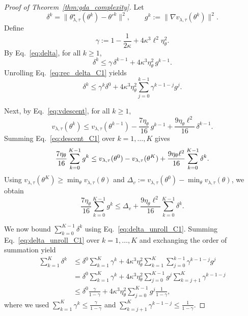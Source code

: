 \documentclass[sigconf]{acmart}
\begin{document}
\begin{proof}[Proof of Theorem~\ref{thm:gda_complexity}]
Let
\[
\delta^k
=
\bigl\|
\theta^{\star}_{\lambda,\tau}(\theta^k)
-
\theta'^k
\bigr\|^2,
\qquad
g^{k}
:=
\bigl\|
\nabla v_{\lambda,\tau}(\theta^{k})
\bigr\|^2.
\]
Define
\[
\gamma
:=
1-\frac{1}{2\kappa}+4\kappa^3\ell^2\eta_\theta^2.
\]
By Eq.~\eqref{eq:delta}, for all $k\ge 1$,
\begin{equation}
\label{eq:rec_delta_C1}
\delta^k \le \gamma\,\delta^{k-1}+4\kappa^3\eta_\theta^2\, g^{k-1}.
\end{equation}
Unrolling Eq.~\eqref{eq:rec_delta_C1} yields
\begin{equation}
\label{eq:delta_unroll_C1}
\delta^k
\le
\gamma^k \delta^0
+
4\kappa^3\eta_\theta^2
\sum_{j=0}^{k-1}\gamma^{k-1-j} g^{j}.
\end{equation}

Next, by Eq.~\eqref{eq:vdescent}, for all $k\ge 1$,
\begin{equation}
\label{eq:descent_C1}
v_{\lambda,\tau}(\theta^k)
\le
v_{\lambda,\tau}(\theta^{k-1})
-
\frac{7\eta_\theta}{16}\, g^{k-1}
+
\frac{9\eta_\theta\ell^2}{16}\,\delta^{k-1}.
\end{equation}
Summing Eq.~\eqref{eq:descent_C1} over $k=1,\dots,K$ gives
\begin{align}
\frac{7\eta_\theta}{16}\sum_{k=0}^{K-1} g^{k}
\le
v_{\lambda,\tau}(\theta^{0})-v_{\lambda,\tau}(\theta^{K})
+
\frac{9\eta_\theta\ell^2}{16}\sum_{k=0}^{K-1}\delta^{k}\notag.
\end{align}
Using $v_{\lambda,\tau}(\theta^{K})\ge \min_{\theta}v_{\lambda,\tau}(\theta)$ and
$\Delta_v:=v_{\lambda,\tau}(\theta^{0})-\min_{\theta}v_{\lambda,\tau}(\theta)$,
we obtain
\begin{equation}
\label{eq:sum_descent_C1b}
\frac{7\eta_\theta}{16}\sum_{k=0}^{K-1} g^{k}
\le
\Delta_v
+
\frac{9\eta_\theta\ell^2}{16}\sum_{k=0}^{K-1}\delta^{k}.
\end{equation}

We now bound $\sum_{k=0}^{K-1}\delta^{k}$ using Eq.~\eqref{eq:delta_unroll_C1}. Summing Eq.~\eqref{eq:delta_unroll_C1} over $k=1,\dots,K$ and exchanging the order of summation yield
\begin{align}
\sum_{k=1}^{K}\delta^{k}
&\le
\delta^{0}\sum_{k=1}^{K}\gamma^{k}
+
4\kappa^3\eta_\theta^2
\sum_{k=1}^{K}\sum_{j=0}^{k-1}\gamma^{k-1-j} g^{j} \nonumber\\
&=
\delta^{0}\sum_{k=1}^{K}\gamma^{k}
+
4\kappa^3\eta_\theta^2
\sum_{j=0}^{K-1} g^{j}\sum_{k=j+1}^{K}\gamma^{k-1-j} \nonumber\\
&\le
\delta^{0}\frac{\gamma}{1-\gamma}
+
4\kappa^3\eta_\theta^2
\sum_{j=0}^{K-1} g^{j}\frac{1}{1-\gamma},
\label{eq:sum_delta_C1}
\end{align}
where we used $\sum_{k=1}^{K}\gamma^{k}\le \frac{\gamma}{1-\gamma}$ and $\sum_{k=j+1}^{K}\gamma^{k-1-j}\le \frac{1}{1-\gamma}$.


\end{proof}
\end{document}
